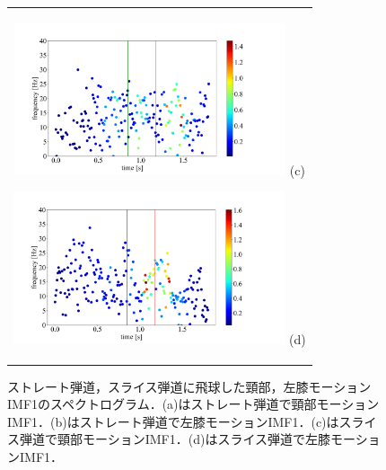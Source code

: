 \begin{figure}
    \begin{center}
        \begin{tabular}{c}
            \begin{minipage}{0.5\hsize}
                \begin{center}
                    \includegraphics[width=8cm]{./images/straight_data/neck/IMF1.png}
                    (c)
                    \label{slice neck imf1}
                \end{center}
            \end{minipage}

            \begin{minipage}{0.5\hsize}
                \begin{center}
                    \includegraphics[width=8cm]{./images/straight_data/left_leg/IMF1.png}
                    (d)
                    \label{slice left leg imf1}
                \end{center}
            \end{minipage}
        \end{tabular}
    \end{center}
    \caption{ストレート弾道，スライス弾道に飛球した頸部，左膝モーションIMF1のスペクトログラム．(a)はストレート弾道で頸部モーションIMF1．(b)はストレート弾道で左膝モーションIMF1．(c)はスライス弾道で頸部モーションIMF1．(d)はスライス弾道で左膝モーションIMF1．}
    \label{imf1}
\end{figure}

